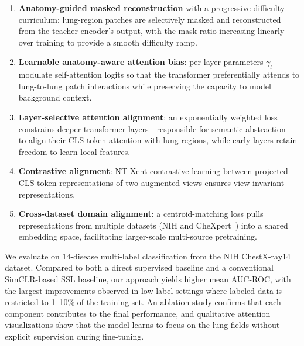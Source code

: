 \begin{enumerate}
    \item \textbf{Anatomy-guided masked reconstruction} with a progressive difficulty curriculum: lung-region patches are selectively masked and reconstructed from the teacher encoder's output, with the mask ratio increasing linearly over training to provide a smooth difficulty ramp.
    \item \textbf{Learnable anatomy-aware attention bias}: per-layer parameters $\gamma_l$ modulate self-attention logits so that the transformer preferentially attends to lung-to-lung patch interactions while preserving the capacity to model background context.
    \item \textbf{Layer-selective attention alignment}: an exponentially weighted loss constrains deeper transformer layers---responsible for semantic abstraction---to align their CLS-token attention with lung regions, while early layers retain freedom to learn local features.
    \item \textbf{Contrastive alignment}: NT-Xent contrastive learning between projected CLS-token representations of two augmented views ensures view-invariant representations.
    \item \textbf{Cross-dataset domain alignment}: a centroid-matching loss pulls representations from multiple datasets (NIH and CheXpert~\cite{irvin2019chexpert}) into a shared embedding space, facilitating larger-scale multi-source pretraining.
\end{enumerate}

We evaluate on 14-disease multi-label classification from the NIH ChestX-ray14 dataset. Compared to both a direct supervised baseline and a conventional SimCLR-based SSL baseline, our approach yields higher mean AUC-ROC, with the largest improvements observed in low-label settings where labeled data is restricted to 1--10\% of the training set. An ablation study confirms that each component contributes to the final performance, and qualitative attention visualizations show that the model learns to focus on the lung fields without explicit supervision during fine-tuning.
